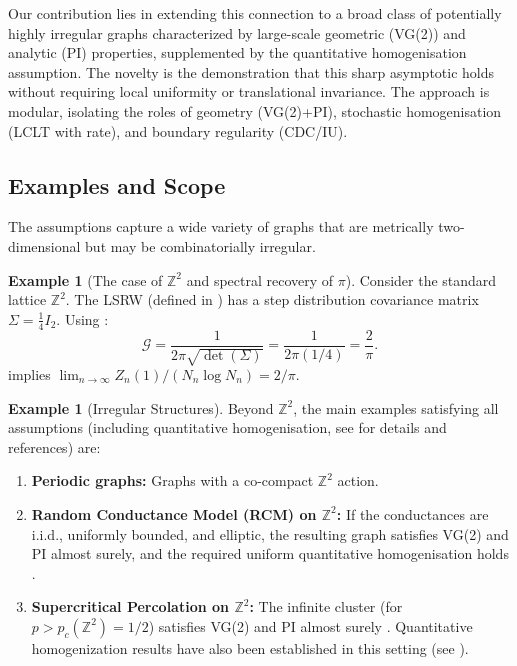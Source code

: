 \documentclass{article}
\numberwithin{equation}{section}
\theoremstyle{definition}
\newtheorem{example}[theorem]{Example}
\theoremstyle{remark}
\newcommand{\cG}{\mathcal{G}}
\begin{document}
Our contribution lies in extending this connection to a broad class of potentially highly irregular graphs characterized by large-scale geometric (VG(2)) and analytic (PI) properties, supplemented by the quantitative homogenisation assumption. The novelty is the demonstration that this sharp asymptotic holds without requiring local uniformity or translational invariance. The approach is modular, isolating the roles of geometry (VG(2)+PI), stochastic homogenisation (LCLT with rate), and boundary regularity (CDC/IU).

\subsection{Examples and Scope}
The assumptions capture a wide variety of graphs that are metrically two-dimensional but may be combinatorially irregular.

\begin{example}[The case of $\mathbb{Z}^2$ and spectral recovery of $\pi$]\label{rem:pi2}
Consider the standard lattice $\mathbb{Z}^2$. The LSRW (defined in ) has a step distribution covariance matrix $\Sigma = \frac{1}{4} I_2$. Using :
\[
\cG = \frac{1}{2\pi \sqrt{\det(\Sigma)}} = \frac{1}{2\pi (1/4)} = \frac{2}{\pi}.
\]
 implies $\lim_{n \to \infty} Z_n(1) / (N_n \log N_n) = 2/\pi$.
\end{example}

\begin{example}[Irregular Structures]\label{ex:irregular}
Beyond $\mathbb{Z}^2$, the main examples satisfying all assumptions (including quantitative homogenisation, see  for details and references) are:
\begin{enumerate}
    \item \textbf{Periodic graphs:} Graphs with a co-compact $\mathbb{Z}^2$ action.
    \item \textbf{Random Conductance Model (RCM) on $\mathbb{Z}^2$:} If the conductances are i.i.d., uniformly bounded, and elliptic, the resulting graph satisfies VG(2) and PI almost surely, and the required uniform quantitative homogenisation holds \cite{Biskup11, AndresDeuschelSlowik19}.
    \item \textbf{Supercritical Percolation on $\mathbb{Z}^2$:} The infinite cluster (for $p>p_c(\mathbb{Z}^2)=1/2$) satisfies VG(2) and PI almost surely \cite{Barlow04}. Quantitative homogenization results have also been established in this setting (see ).
\end{enumerate}
\end{example}
\end{document}
